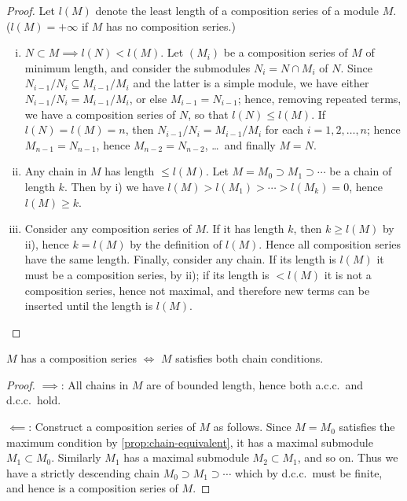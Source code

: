 \begin{proof}
Let $l(M)$ denote the least length of a composition series of a module $M$. ($l(M) = +\infty$ if $M$ has no composition series.)

\begin{enumerate}[i)]
    \item $N \subset M \implies l(N) < l(M)$. Let $(M_i)$ be a composition series of $M$ of minimum length, and consider the submodules $N_i = N \cap M_i$ of $N$. Since $N_{i-1}/N_i \subseteq M_{i-1}/M_i$ and the latter is a simple module, we have either $N_{i-1}/N_i = M_{i-1}/M_i$, or else $M_{i-1} = N_{i-1}$; hence, removing repeated terms, we have a composition series of $N$, so that $l(N) \leq l(M)$. If $l(N) = l(M) = n$, then $N_{i-1}/N_i = M_{i-1}/M_i$ for each $i = 1, 2, \ldots, n$; hence $M_{n-1} = N_{n-1}$, hence $M_{n-2} = N_{n-2}$, \ldots\ and finally $M = N$.
    
    \item Any chain in $M$ has length $\leq l(M)$. Let $M = M_0 \supset M_1 \supset \cdots$ be a chain of length $k$. Then by i) we have $l(M) > l(M_1) > \cdots > l(M_k) = 0$, hence $l(M) \geq k$.
    
    \item Consider any composition series of $M$. If it has length $k$, then $k \geq l(M)$ by ii), hence $k = l(M)$ by the definition of $l(M)$. Hence all composition series have the same length. Finally, consider any chain. If its length is $l(M)$ it must be a composition series, by ii); if its length is $< l(M)$ it is not a composition series, hence not maximal, and therefore new terms can be inserted until the length is $l(M)$. \qedhere
\end{enumerate}
\end{proof}

\begin{proposition}\label{prop:composition-chain}
    $M$ has a composition series $\iff$ $M$ satisfies both chain conditions.
\end{proposition}

\begin{proof}
    $\implies$: All chains in $M$ are of bounded length, hence both a.c.c.\ and d.c.c.\ hold.

    $\impliedby$: Construct a composition series of $M$ as follows. Since $M = M_0$ satisfies the maximum condition by \eqref{prop:chain-equivalent}, it has a maximal submodule $M_1 \subset M_0$. Similarly $M_1$ has a maximal submodule $M_2 \subset M_1$, and so on. Thus we have a strictly descending chain $M_0 \supset M_1 \supset \cdots$ which by d.c.c.\ must be finite, and hence is a composition series of $M$.
\end{proof}

